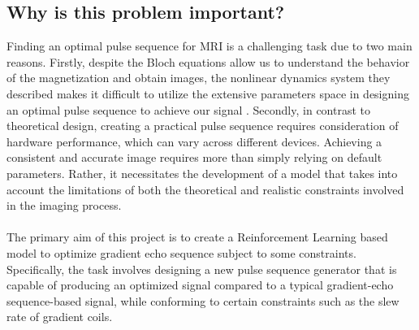 \subsection{Why is this problem important?}
Finding an optimal pulse sequence for MRI is a challenging task due to two main reasons. Firstly, despite the Bloch equations allow us to understand the behavior of the magnetization and obtain images, the nonlinear dynamics system they described makes it difficult to utilize the extensive parameters space in designing an optimal pulse sequence to achieve our signal \citep{0438}. Secondly, in contrast to theoretical design, creating a practical pulse sequence requires consideration of hardware performance, which can vary across different devices. Achieving a consistent and accurate image requires more than simply relying on default parameters. Rather, it necessitates the development of a model that takes into account the limitations of both the theoretical and realistic constraints involved in the imaging process. 
\\\\
The primary aim of this project is to create a Reinforcement Learning based model to optimize gradient echo sequence subject to some constraints. Specifically, the task involves designing a new pulse sequence generator that is capable of producing an optimized signal compared to a typical gradient-echo sequence-based signal, while conforming to certain constraints such as the slew rate of gradient coils.